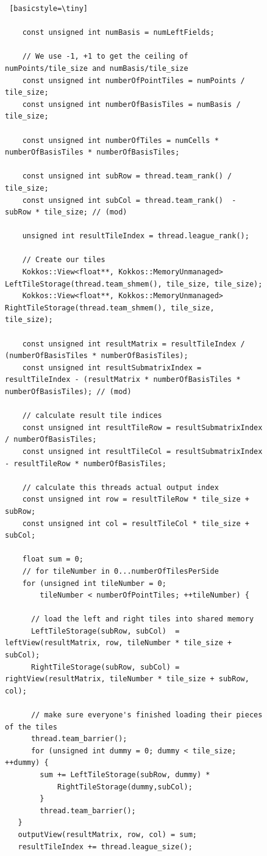 \begin{figure}[H]
    \begin{lstlisting} [basicstyle=\tiny]
    
    const unsigned int numBasis = numLeftFields;

    // We use -1, +1 to get the ceiling of numPoints/tile_size and numBasis/tile_size
    const unsigned int numberOfPointTiles = numPoints / tile_size;
    const unsigned int numberOfBasisTiles = numBasis / tile_size;

    const unsigned int numberOfTiles = numCells * numberOfBasisTiles * numberOfBasisTiles;

    const unsigned int subRow = thread.team_rank() / tile_size;
    const unsigned int subCol = thread.team_rank()  - subRow * tile_size; // (mod)

    unsigned int resultTileIndex = thread.league_rank();

    // Create our tiles
    Kokkos::View<float**, Kokkos::MemoryUnmanaged> LeftTileStorage(thread.team_shmem(), tile_size, tile_size);
    Kokkos::View<float**, Kokkos::MemoryUnmanaged> RightTileStorage(thread.team_shmem(), tile_size, tile_size);

    const unsigned int resultMatrix = resultTileIndex / (numberOfBasisTiles * numberOfBasisTiles);
    const unsigned int resultSubmatrixIndex = resultTileIndex - (resultMatrix * numberOfBasisTiles * numberOfBasisTiles); // (mod)

    // calculate result tile indices
    const unsigned int resultTileRow = resultSubmatrixIndex / numberOfBasisTiles;
    const unsigned int resultTileCol = resultSubmatrixIndex  - resultTileRow * numberOfBasisTiles;

    // calculate this threads actual output index
    const unsigned int row = resultTileRow * tile_size + subRow;
    const unsigned int col = resultTileCol * tile_size + subCol;

    float sum = 0;
    // for tileNumber in 0...numberOfTilesPerSide
    for (unsigned int tileNumber = 0;
        tileNumber < numberOfPointTiles; ++tileNumber) {

      // load the left and right tiles into shared memory
      LeftTileStorage(subRow, subCol)  = leftView(resultMatrix, row, tileNumber * tile_size + subCol);
      RightTileStorage(subRow, subCol) = rightView(resultMatrix, tileNumber * tile_size + subRow, col);
      
      // make sure everyone's finished loading their pieces of the tiles
      thread.team_barrier();
      for (unsigned int dummy = 0; dummy < tile_size; ++dummy) {
        sum += LeftTileStorage(subRow, dummy) *
            RightTileStorage(dummy,subCol);
        }
        thread.team_barrier();
   }
   outputView(resultMatrix, row, col) = sum;
   resultTileIndex += thread.league_size();
 \end{lstlisting}
 \label{lst:ContractFieldFieldScalarTiling}
\end{figure}


